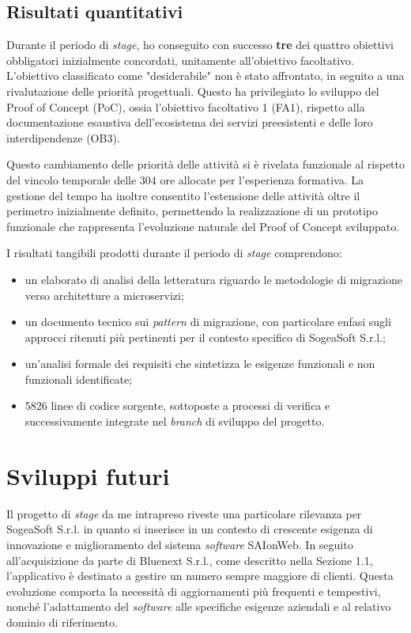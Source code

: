         
        \subsection{Risultati quantitativi}
        Durante il periodo di \textit{stage}, ho conseguito con successo \textbf{tre} dei quattro obiettivi obbligatori inizialmente concordati, unitamente all'obiettivo facoltativo. L'obiettivo classificato come "desiderabile" non è stato affrontato, in seguito a una rivalutazione delle priorità progettuali. Questo ha privilegiato lo sviluppo del Proof of Concept (PoC), ossia l'obiettivo facoltativo 1 (FA1), rispetto alla documentazione esaustiva dell'ecosistema dei servizi preesistenti e delle loro interdipendenze (OB3).

        \vspace{0.2 em}
        \noindent Questo cambiamento delle priorità delle attività si è rivelata funzionale al rispetto del vincolo temporale delle 304 ore allocate per l'esperienza formativa. La gestione del tempo ha inoltre consentito l'estensione delle attività oltre il perimetro inizialmente definito, permettendo la realizzazione di un prototipo funzionale che rappresenta l'evoluzione naturale del Proof of Concept sviluppato.

        \vspace{0.2 em}
        \noindent I risultati tangibili prodotti durante il periodo di \textit{stage} comprendono:
        \begin{itemize}
            \item un elaborato di analisi della letteratura riguardo le metodologie di migrazione verso architetture a microservizi;
            \item un documento tecnico sui \textit{pattern} di migrazione, con particolare enfasi sugli approcci ritenuti più pertinenti per il contesto specifico di SogeaSoft S.r.l.;
            \item un'analisi formale dei requisiti che sintetizza le esigenze funzionali e non funzionali identificate;
            \item 5826 linee di codice sorgente, sottoposte a processi di verifica e successivamente integrate nel \textit{branch} di sviluppo del progetto.
        \end{itemize}
        
    \section{Sviluppi futuri}
    Il progetto di \textit{stage} da me intrapreso riveste una particolare rilevanza per SogeaSoft S.r.l. in quanto si inserisce in un contesto di crescente esigenza di innovazione e miglioramento del sistema \textit{software} SAIonWeb. In seguito all’acquisizione da parte di Bluenext S.r.l., come descritto nella Sezione 1.1, l’applicativo è destinato a gestire un numero sempre maggiore di clienti. Questa evoluzione comporta la necessità di aggiornamenti più frequenti e tempestivi, nonché l’adattamento del \textit{software} alle specifiche esigenze aziendali e al relativo dominio di riferimento.  

